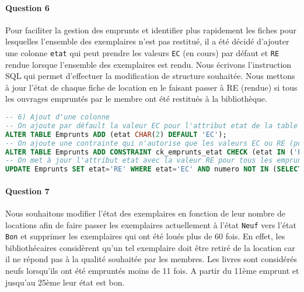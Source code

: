 \documentclass[10pt, oneside]{article}
\begin{document}

\paragraph{Question 6} Pour faciliter la gestion des emprunts et identifier plus rapidement les fiches pour lesquelles l'ensemble des exemplaires n'est pas restitué, il a été décidé d'ajouter une colonne \texttt{etat} qui peut prendre les valeurs \texttt{EC} (en cours) par défaut et \texttt{RE} rendue lorsque l'ensemble des exemplaires est rendu. Nous écrivons l'instruction SQL qui permet d'effectuer la modification de structure souhaitée. Nous mettons à jour l'état de chaque fiche de location en le faisant passer à RE (rendue) si tous les ouvrages empruntés par le membre ont été restitués à la bibliothèque.

\begin{lstlisting}[language=sql, title=Question 6, label=QII6]
-- 6) Ajout d'une colonne 
-- On ajoute par défault la valeur EC pour l'attribut etat de la table Emprunts qui signifie que l'emprunt est en cours
ALTER TABLE Emprunts ADD (etat CHAR(2) DEFAULT 'EC');
-- On ajoute une contrainte qui n'autorise que les valeurs EC ou RE (pour Rendu) pour l'attribut etat de la table Emprunts
ALTER TABLE Emprunts ADD CONSTRAINT ck_emprunts_etat CHECK (etat IN ('EC', 'RE'));
-- On met à jour l'attribut etat avec la valeur RE pour tous les emprunts qui ont une date de retour (rendule différent de NULL)
UPDATE Emprunts SET etat='RE' WHERE etat='EC' AND numero NOT IN (SELECT emprunt FROM Details WHERE rendule IS NULL);

\end{lstlisting}


\paragraph{Question 7} Nous souhaitons modifier l'état des exemplaires en fonction de leur nombre de locations afin de faire passer les exemplaires actuellement à l'état \texttt{Neuf} vers l'état \texttt{Bon} et supprimer les exemplaires qui ont été loués plus de 60 fois. En effet, les bibliothécaires considèrent qu'un tel exemplaire doit être retiré de la location car il ne répond pas à la qualité souhaitée par les membres. Les livres sont considérés neufs lorsqu'ils ont été empruntés moins de 11 fois. A partir du 11ème emprunt et jusqu'au 25ème leur état est bon.
\end{document}
